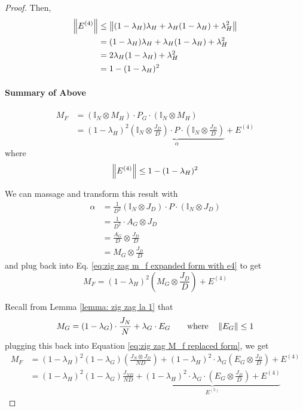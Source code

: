 \begin{proof}
	Then, 
	\begin{align}
		\left\lVert E^{(4)}\right\rVert 
		&\leq \left\lVert (1 - \lambda_H) \lambda_H + \lambda_H (1 - \lambda_H) + \lambda_H ^2\right\rVert \\
		&= (1 - \lambda_H) \lambda_H + \lambda_H (1 - \lambda_H) + \lambda_H ^2 \\ 
		&= 2 \lambda_H (1 - \lambda_H) + \lambda_H^2 \\
		&= 1 - (1 - \lambda_H)^2
	\end{align}
	\begin{mdframed}
		\paragraph{Summary of Above}
		\begin{align}
			M_F
			&= (\mathbb I _N \otimes M_H ) \cdot P_G \cdot ( \mathbb I _ N \otimes M_H ) \\
			&= (1 - \lambda_H)^2 \underbrace{\left( \mathbb I _N \otimes \frac{J_D}{D} \right) \cdot P \cdot \left( \mathbb I _N \otimes \frac{J_D}{D} \right)}_{\alpha} + E^{(4)} \label{eq:zig zag m_f expanded form with e4}
		\end{align}
		where 
		\begin{equation}
			\left\lVert E^{(4)}\right\rVert \leq 1 - (1 - \lambda_H) ^2
		\end{equation}
	\end{mdframed}
	
	We can massage and transform this result with 
	\begin{align}
		\alpha 
		&= \frac{1}{D^2} ( \mathbb I _N \otimes J_D ) \cdot P \cdot ( \mathbb I _N \otimes J_D )  \\
		&= \frac{1}{D^2} \cdot A_G \otimes J_D \\
		&= \frac{A_G}{D} \otimes \frac{J_D}{D} \\
		&= M_G \otimes \frac{J_D}{D}
	\end{align}
	and plug back into Eq. \ref{eq:zig zag m_f expanded form with e4} to get
	\begin{equation}
		M_F = (1 - \lambda_H)^2 \left( M_G \otimes \frac{J_D}{D} \right ) + E^{(4)} \label{eq:zig zag M_f replaced form}
	\end{equation}
	
	Recall from Lemma \ref{lemma: zig zag la 1} that
	\begin{equation}
		M_G = (1 - \lambda_G) \cdot \frac{J_N}{N} + \lambda_G \cdot E_G \quad \quad \text{where} \quad \left\lVert E_G\right\rVert \leq 1
	\end{equation}
	plugging this back into Equation \ref{eq:zig zag M_f replaced form}, we get 
	\begin{align}
		M_F
		&= (1 - \lambda_H) ^ 2 (1 - \lambda_G) \left( \frac{J_N \otimes J_D}{ND} \right) + (1 - \lambda_H ) ^2 \cdot \lambda_G \left( E_G \otimes \frac{J_D}{D} \right) + E^{(4)} \\
		&= (1 - \lambda_H)^2 (1 - \lambda_G) \frac{J_{ND}}{ND} + \underbrace{(1 - \lambda_H)^2 \cdot \lambda_G \cdot \left( E_G \otimes \frac{J_D}{D} \right) + E^{(4)}}_{E^{(5)}}
	\end{align}
	

\end{proof}
